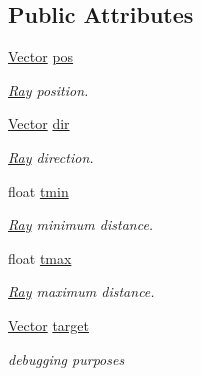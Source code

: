 \subsection*{Public Attributes}
\begin{DoxyCompactItemize}
\item 
\mbox{\label{class_ray_a7efe0dcd9166fc825c09359460c8f99a}} 
\mbox{\hyperlink{struct_vector}{Vector}} \mbox{\hyperlink{class_ray_a7efe0dcd9166fc825c09359460c8f99a}{pos}}
\begin{DoxyCompactList}\small\item\em \mbox{\hyperlink{class_ray}{Ray}} position. \end{DoxyCompactList}\item 
\mbox{\label{class_ray_acfb8b7801f774b160fa51404dd65f2a5}} 
\mbox{\hyperlink{struct_vector}{Vector}} \mbox{\hyperlink{class_ray_acfb8b7801f774b160fa51404dd65f2a5}{dir}}
\begin{DoxyCompactList}\small\item\em \mbox{\hyperlink{class_ray}{Ray}} direction. \end{DoxyCompactList}\item 
\mbox{\label{class_ray_a6a0a2346b82854fa203552c200bc654f}} 
float \mbox{\hyperlink{class_ray_a6a0a2346b82854fa203552c200bc654f}{tmin}}
\begin{DoxyCompactList}\small\item\em \mbox{\hyperlink{class_ray}{Ray}} minimum distance. \end{DoxyCompactList}\item 
\mbox{\label{class_ray_a603b9ffee3760225c80b13eaf30c5441}} 
float \mbox{\hyperlink{class_ray_a603b9ffee3760225c80b13eaf30c5441}{tmax}}
\begin{DoxyCompactList}\small\item\em \mbox{\hyperlink{class_ray}{Ray}} maximum distance. \end{DoxyCompactList}\item 
\mbox{\label{class_ray_ae75991746cc64ed2e7613e0e99988ec1}} 
\mbox{\hyperlink{struct_vector}{Vector}} \mbox{\hyperlink{class_ray_ae75991746cc64ed2e7613e0e99988ec1}{target}}
\begin{DoxyCompactList}\small\item\em debugging purposes \end{DoxyCompactList}\end{DoxyCompactItemize}


